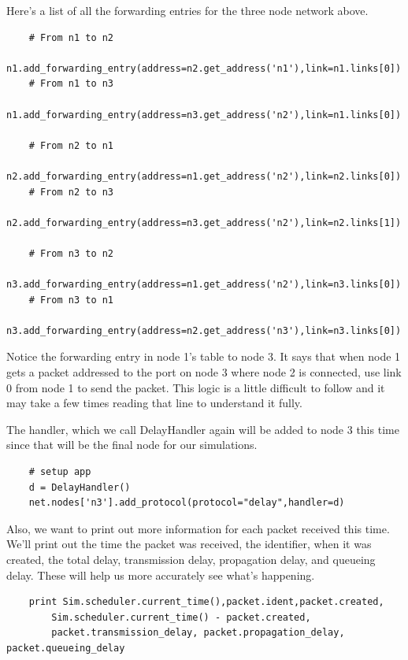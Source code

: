 \documentclass[11pt]{article}
\begin{document}
Here's a list of all the forwarding entries for the three node network above.

\vspace{5mm}

\begin{lstlisting}
    # From n1 to n2
    n1.add_forwarding_entry(address=n2.get_address('n1'),link=n1.links[0])
    # From n1 to n3
    n1.add_forwarding_entry(address=n3.get_address('n2'),link=n1.links[0])

    # From n2 to n1
    n2.add_forwarding_entry(address=n1.get_address('n2'),link=n2.links[0])
    # From n2 to n3
    n2.add_forwarding_entry(address=n3.get_address('n2'),link=n2.links[1])

    # From n3 to n2
    n3.add_forwarding_entry(address=n1.get_address('n2'),link=n3.links[0])
    # From n3 to n1
    n3.add_forwarding_entry(address=n2.get_address('n3'),link=n3.links[0])
\end{lstlisting}

\vspace{5mm}

Notice the forwarding entry in node 1's table to node 3. It says that when node 1 gets a packet addressed to the port on node 3 where node 2 is connected, use link 0 from node 1 to send the packet. This logic is a little difficult to follow and it may take a few times reading that line to understand it fully. \par
The handler, which we call DelayHandler again will be added to node 3 this time since that will be the final node for our simulations.

\vspace{5mm}

\begin{lstlisting}
    # setup app
    d = DelayHandler()
    net.nodes['n3'].add_protocol(protocol="delay",handler=d)
\end{lstlisting}

\vspace{5mm}

Also, we want to print out more information for each packet received this time. We'll print out the time the packet was received, the identifier, when it was created, the total delay, transmission delay, propagation delay, and queueing delay. These will help us more accurately see what's happening.

\vspace{5mm}

\begin{lstlisting}
    print Sim.scheduler.current_time(),packet.ident,packet.created,
        Sim.scheduler.current_time() - packet.created,
        packet.transmission_delay, packet.propagation_delay, packet.queueing_delay
\end{lstlisting}
\end{document}
